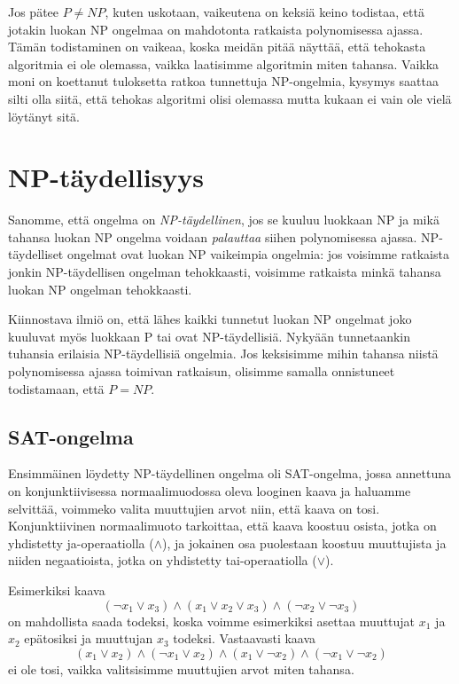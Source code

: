 Jos pätee $P \neq NP$, kuten uskotaan,
vaikeutena on keksiä keino todistaa, että jotakin
luokan NP ongelmaa on mahdotonta ratkaista
polynomisessa ajassa.
Tämän todistaminen on vaikeaa, koska meidän pitää näyttää,
että tehokasta algoritmia ei ole olemassa,
vaikka laatisimme algoritmin miten tahansa.
Vaikka moni on koettanut tuloksetta ratkoa
tunnettuja NP-ongelmia, kysymys saattaa silti olla siitä,
että tehokas algoritmi olisi olemassa mutta kukaan ei
vain ole vielä löytänyt sitä.

\section{NP-täydellisyys}

Sanomme, että ongelma on \emph{NP-täydellinen},
jos se kuuluu luokkaan NP ja mikä tahansa luokan NP
ongelma voidaan \emph{palauttaa} siihen polynomisessa ajassa.
NP-täydelliset ongelmat ovat luokan NP vaikeimpia ongelmia:
jos voisimme ratkaista jonkin NP-täydellisen ongelman tehokkaasti,
voisimme ratkaista minkä tahansa luokan NP ongelman tehokkaasti.

Kiinnostava ilmiö on, että lähes kaikki tunnetut luokan NP
ongelmat joko kuuluvat myös luokkaan P tai ovat
NP-täydellisiä.
Nykyään tunnetaankin tuhansia erilaisia NP-täydellisiä ongelmia.
Jos keksisimme mihin tahansa niistä polynomisessa ajassa toimivan
ratkaisun, olisimme samalla onnistuneet todistamaan, että $P=NP$.

\subsection{SAT-ongelma}

Ensimmäinen löydetty NP-täydellinen ongelma oli
SAT-ongelma, jossa annettuna on konjunktiivisessa
normaalimuodossa oleva looginen kaava ja haluamme
selvittää, voimmeko valita muuttujien arvot niin,
että kaava on tosi.
Konjunktiivinen normaalimuoto tarkoittaa,
että kaava koostuu osista, jotka on yhdistetty
ja-operaatiolla ($\land$), ja jokainen osa puolestaan koostuu
muuttujista ja niiden negaatioista, jotka on yhdistetty
tai-operaatiolla ($\lor$).

Esimerkiksi kaava
\[(\neg x_1 \lor x_3) \land (x_1 \lor x_2 \lor x_3) \land (\neg x_2 \lor \neg x_3)\]
on mahdollista saada todeksi, koska voimme esimerkiksi asettaa
muuttujat $x_1$ ja $x_2$ epätosiksi ja muuttujan $x_3$ todeksi.
Vastaavasti kaava
\[(x_1 \lor x_2) \land (\neg x_1 \lor x_2) \land (x_1 \lor \neg x_2) \land (\neg x_1 \lor \neg x_2) \]
ei ole tosi, vaikka valitsisimme muuttujien arvot miten tahansa.

